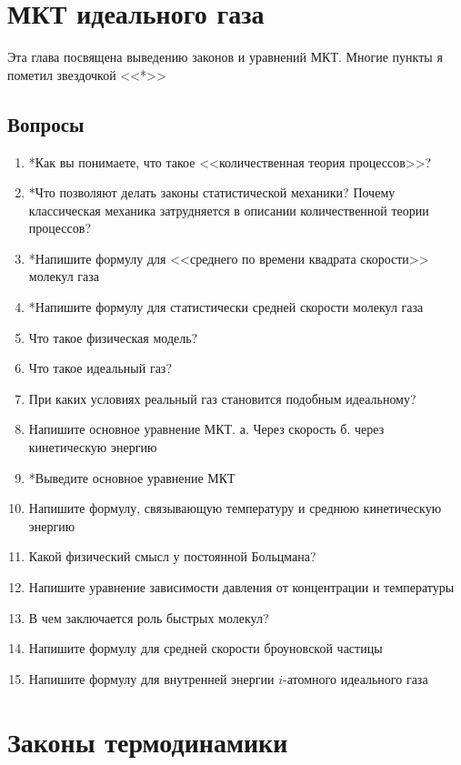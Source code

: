 \documentclass[12pt,a4paper]{report}
\begin{document}
\chapter{МКТ идеального газа}
Эта глава посвящена выведению законов и уравнений МКТ. Многие пункты я пометил звездочкой <<*>>
\section{Вопросы}
\begin{enumerate}
\item *Как вы понимаете, что такое <<количественная теория процессов>>?
\item *Что позволяют делать законы статистической механики? Почему классическая механика затрудняется в описании количественной теории процессов?
\item *Напишите формулу для <<среднего по времени квадрата скорости>> молекул газа
\item *Напишите формулу для статистически средней скорости молекул газа
\item Что такое физическая модель?
\item Что такое идеальный газ?
\item При каких условиях реальный газ становится подобным идеальному?
\item Напишите основное уравнение МКТ. а. Через скорость б. через кинетическую энергию 
\item *Выведите основное уравнение МКТ
\item Напишите формулу, связывающую температуру и среднюю кинетическую энергию
\item Какой физический смысл у постоянной Больцмана?
\item Напишите уравнение зависимости давления от концентрации и температуры
\item В чем заключается роль быстрых молекул?
\item Напишите формулу для средней скорости броуновской частицы
\item Напишите формулу для внутренней энергии $i$-атомного идеального газа
\end{enumerate}

\chapter{Законы термодинамики}
\end{document}
